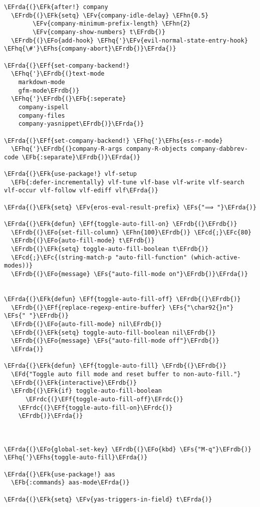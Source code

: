 \documentclass[a4wide,10pt]{article}
\newcommand{\EFc}[1]{\textcolor{EFc}{#1}} %
\newcommand{\EFcd}[1]{\textcolor{EFcd}{#1}} %
\newcommand{\EFs}[1]{\textcolor{EFs}{#1}} %
\newcommand{\EFd}[1]{\textcolor{EFd}{#1}} %
\newcommand{\EFk}[1]{\textcolor{EFk}{#1}} %
\newcommand{\EFb}[1]{\textcolor{EFb}{#1}} %
\newcommand{\EFf}[1]{\textcolor{EFf}{#1}} %
\newcommand{\EFv}[1]{\textcolor{EFv}{#1}} %
\newcommand{\EFo}[1]{\textcolor{EFo}{#1}} %
\newcommand{\EFhn}[1]{\textcolor{EFhn}{\textbf{#1}}} %
\newcommand{\EFhq}[1]{\textcolor{EFhq}{#1}} %
\newcommand{\EFhs}[1]{\textcolor{EFhs}{#1}} %
\newcommand{\EFrda}[1]{\textcolor{EFrda}{#1}} %
\newcommand{\EFrdb}[1]{\textcolor{EFrdb}{#1}} %
\newcommand{\EFrdc}[1]{\textcolor{EFrdc}{#1}} %
\begin{document}
\begin{Code}
\begin{Verbatim}
\EFrda{(}\EFk{after!} company
  \EFrdb{(}\EFk{setq} \EFv{company-idle-delay} \EFhn{0.5}
        \EFv{company-minimum-prefix-length} \EFhn{2}
        \EFv{company-show-numbers} t\EFrdb{)}
  \EFrdb{(}\EFo{add-hook} \EFhq{'}\EFv{evil-normal-state-entry-hook} \EFhq{\#'}\EFhs{company-abort}\EFrdb{)}\EFrda{)}

\EFrda{(}\EFf{set-company-backend!}
  \EFhq{'}\EFrdb{(}text-mode
    markdown-mode
    gfm-mode\EFrdb{)}
  \EFhq{'}\EFrdb{(}\EFb{:seperate}
    company-ispell
    company-files
    company-yasnippet\EFrdb{)}\EFrda{)}

\EFrda{(}\EFf{set-company-backend!} \EFhq{'}\EFhs{ess-r-mode}
  \EFhq{'}\EFrdb{(}company-R-args company-R-objects company-dabbrev-code \EFb{:separate}\EFrdb{)}\EFrda{)}

\EFrda{(}\EFk{use-package!} vlf-setup
  \EFb{:defer-incrementally} vlf-tune vlf-base vlf-write vlf-search vlf-occur vlf-follow vlf-ediff vlf\EFrda{)}

\EFrda{(}\EFk{setq} \EFv{eros-eval-result-prefix} \EFs{"⟹ "}\EFrda{)}

\EFrda{(}\EFk{defun} \EFf{toggle-auto-fill-on} \EFrdb{(}\EFrdb{)}
  \EFrdb{(}\EFo{set-fill-column} \EFhn{100}\EFrdb{)} \EFcd{;}\EFc{80}
  \EFrdb{(}\EFo{auto-fill-mode} t\EFrdb{)}
  \EFrdb{(}\EFk{setq} toggle-auto-fill-boolean t\EFrdb{)}
  \EFcd{;}\EFc{(string-match-p "auto-fill-function" (which-active-modes))}
  \EFrdb{(}\EFo{message} \EFs{"auto-fill-mode on"}\EFrdb{)}\EFrda{)}


\EFrda{(}\EFk{defun} \EFf{toggle-auto-fill-off} \EFrdb{(}\EFrdb{)}
  \EFrdb{(}\EFf{replace-regexp-entire-buffer} \EFs{"\char92{}n"} \EFs{" "}\EFrdb{)}
  \EFrdb{(}\EFo{auto-fill-mode} nil\EFrdb{)}
  \EFrdb{(}\EFk{setq} toggle-auto-fill-boolean nil\EFrdb{)}
  \EFrdb{(}\EFo{message} \EFs{"auto-fill-mode off"}\EFrdb{)}
  \EFrda{)}

\EFrda{(}\EFk{defun} \EFf{toggle-auto-fill} \EFrdb{(}\EFrdb{)}
  \EFd{"Toggle auto fill mode and reset buffer to non-auto-fill."}
  \EFrdb{(}\EFk{interactive}\EFrdb{)}
  \EFrdb{(}\EFk{if} toggle-auto-fill-boolean
      \EFrdc{(}\EFf{toggle-auto-fill-off}\EFrdc{)}
    \EFrdc{(}\EFf{toggle-auto-fill-on}\EFrdc{)}
    \EFrdb{)}\EFrda{)}



\EFrda{(}\EFo{global-set-key} \EFrdb{(}\EFo{kbd} \EFs{"M-q"}\EFrdb{)} \EFhq{'}\EFhs{toggle-auto-fill}\EFrda{)}

\EFrda{(}\EFk{use-package!} aas
  \EFb{:commands} aas-mode\EFrda{)}

\EFrda{(}\EFk{setq} \EFv{yas-triggers-in-field} t\EFrda{)}


\end{Verbatim}
\end{Code}
\end{document}
